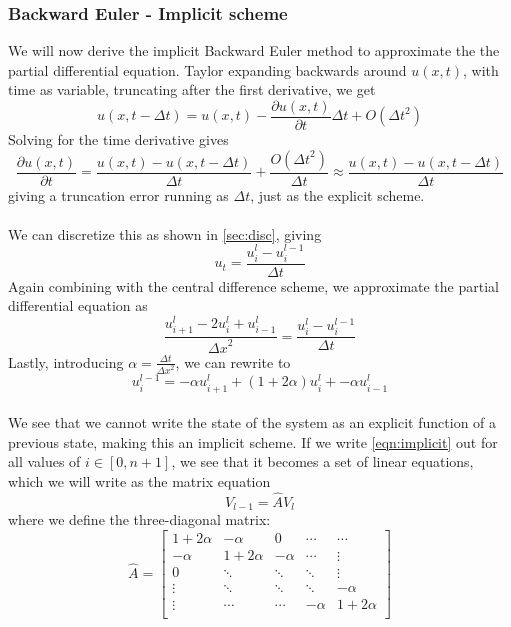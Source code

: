 \documentclass[10pt,a4paper]{article}
\newcommand{\dt}{{\Delta t}}
\newcommand{\dx}{{\Delta x}}
\newcommand{\pt}{{\partial t}}
\newcommand{\pu}{{\partial u}}
\begin{document}
\subsubsection{Backward Euler - Implicit scheme}
We will now derive the implicit Backward Euler method to approximate the the partial differential equation. Taylor expanding backwards around $u(x,t)$, with time as variable, truncating after the first derivative, we get
\begin{equation}
u(x,t-\dt) = u(x,t) - \frac{\pu(x,t)}{\pt}\dt + O(\dt^2)
\end{equation}
Solving for the time derivative gives
\begin{equation}
\frac{\pu(x,t)}{\pt} = \frac{u(x,t) - u(x,t-\dt)}{\dt} + \frac{O(\dt^2)}{\dt} \approx \frac{u(x,t) - u(x,t-\dt)}{\dt}
\end{equation}
giving a truncation error running as $\dt$, just as the explicit scheme.
\\\\
We can discretize this as shown in \ref{sec:disc}, giving
\begin{equation}
u_t = \frac{u_i^l - u_i^{l-1}}{\dt}
\end{equation}
Again combining with the central difference scheme, we approximate the partial differential equation as
\begin{equation}
\frac{u_{i+1}^l - 2u_i^l+u_{i-1}^l}{\dx^2} = \frac{u_i^l - u_i^{l-1}}{\dt}
\end{equation}
Lastly, introducing $\alpha = \frac{\dt}{\dx^2}$, we can rewrite to
\begin{equation}\label{eqn:implicit}
u_i^{l-1} = -\alpha u_{i+1}^l + (1 + 2\alpha )u_i^l + -\alpha u_{i-1}^l
\end{equation}
\\
We see that we cannot write the state of the system as an explicit function of a previous state, making this an implicit scheme. If we write \ref{eqn:implicit} out for all values of $i \in [0,n+1]$, we see that it becomes a set of linear equations, which we will write as the matrix equation
\begin{equation}
V_{l-1} = \hat{A}V_l
\end{equation}
where we define the three-diagonal matrix:
\begin{equation}
\hat{A} = \begin{bmatrix}
1+2\alpha & -\alpha & 0 & \cdots & \cdots \\
-\alpha & 1+2\alpha & -\alpha & \cdots & \vdots \\
0 & \ddots & \ddots & \ddots & \vdots \\
\vdots & \ddots & \ddots & \ddots & -\alpha \\
\vdots & \cdots & \cdots & -\alpha & 1+2\alpha \\
\end{bmatrix}
\end{equation}
\end{document}
